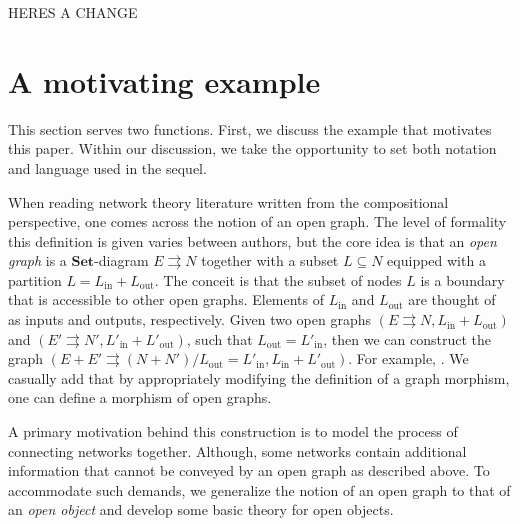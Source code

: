 \documentclass{amsart}
\newcommand{\Set}{\cat{Set}}
\newcommand{\cat}[1]{\mathbf{#1}}
\renewcommand{\t}[1]{\text{#1}}
\theoremstyle{remark}
\theoremstyle{definition}
\begin{document}
HERES A CHANGE


\section{A motivating example} \label{sec:motivating-example}

This section serves two functions. First, we discuss the example that motivates this paper.  Within our discussion, we take the opportunity to set both notation and language used in the sequel.  

When reading network theory literature written from the compositional perspective, one comes across the notion of an open graph. 
The level of formality this definition is given varies between authors, but the core idea is that an \emph{open graph} is a $ \Set $-diagram $ E \rightrightarrows N $ together with a subset $ L \subseteq N$ equipped with a partition $ L = L_{ \t{in} } + L_{ \t{out} } $.
The conceit is that the subset of nodes $ L $ is a boundary that is accessible to other open graphs. Elements of $ L_{ \t{in} } $ and $ L_{ \t{out} } $ are thought of as inputs and outputs, respectively.  Given two open graphs $ (E \rightrightarrows N , L_{ \t{in} } + L_{ \t{out} }) $ and $ (E' \rightrightarrows N' , L'_{ \t{in} } + L'_{ \t{out} }) $, such that $ L_{ \t{out} } = L'_{ \t{in} } $, then we can construct the graph $ (E + E' \rightrightarrows (N + N') / L_{ \t{out} } = L'_{ \t{in} } ,  L_{ \t{in} } + L'_{ \t{out} } ) $.  For example,
	.
We casually add that by appropriately modifying the definition of a graph morphism, one can define a morphism of open graphs.

A primary motivation behind this construction is to model the process of connecting networks together.  Although, some networks contain additional information that cannot be conveyed by an open graph as described above.
To accommodate such demands, we generalize the notion of an open graph to that of an \emph{open object} and develop some basic theory for open objects.  
\end{document}

